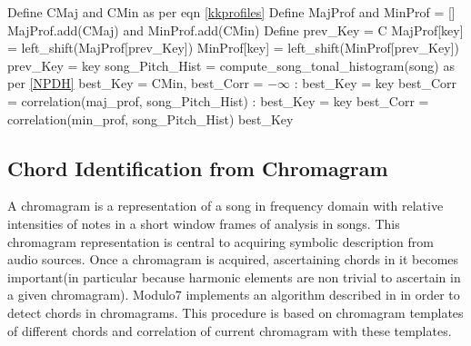 \begin{algorithm}

\label{CHalgorithm}
\begin{algorithmic}[1]
 {}
\State Define CMaj and CMin as per eqn \ref{kkprofiles}
\State Define MajProf and MinProf = [] %
\State MajProf.add(CMaj) and MinProf.add(CMin)
\State Define prev\_Key = C 
\State MajProf[key] = left\_shift(MajProf[prev\_Key])
\State MinProf[key] = left\_shift(MinProf[prev\_Key])
\State prev\_Key = key
\EndFor
\State song\_Pitch\_Hist = compute\_song\_tonal\_histogram(song) as per \ref{NPDH}
\State best\_Key = CMin, best\_Corr = $-\infty$
:
\State best\_Key = key
\State best\_Corr = correlation(maj\_prof, song\_Pitch\_Hist)
\EndIf
\EndFor
{}:
\State best\_Key = key
\State best\_Corr = correlation(min\_prof, song\_Pitch\_Hist)
\EndIf
\EndFor
\Return best\_Key
\EndProcedure
\end{algorithmic}
\end{algorithm}

\subsection{Chord Identification from Chromagram}

\noindent A chromagram \cite{chromagramtutorial} is a representation of a song in frequency domain with relative intensities of notes in a short window frames of analysis in songs. This chromagram representation is central to acquiring symbolic description from audio sources. Once a chromagram is acquired, ascertaining chords in it becomes important(in particular because harmonic elements are non trivial to ascertain in a given chromagram). Modulo7 implements an algorithm described in \cite{chord-detection} in order to detect chords in chromagrams. This procedure is based on chromagram templates of different chords and correlation of current chromagram with these templates.
